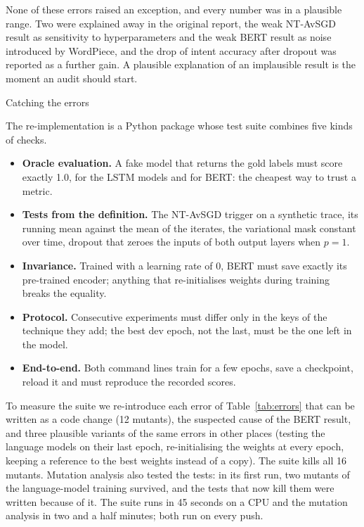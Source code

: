 \documentclass[10pt,twocolumn,a4paper]{article}
\makeatletter
\renewcommand\section{\@startsection{section}{1}{\z@}{-7pt plus -2pt minus -1pt}{3pt}%
  {\normalfont\normalsize\bfseries}}
\newenvironment{tightlist}{\begin{itemize}\setlength{\itemsep}{1pt}\setlength{\parskip}{0pt}%
  \setlength{\topsep}{2pt}\setlength{\leftmargin}{1.1em}}{\end{itemize}}
\makeatother
\begin{document}
None of these errors raised an exception, and every number was in a plausible range. Two were explained away in
the original report, the weak NT-AvSGD result as sensitivity to hyperparameters and the weak BERT result as noise
introduced by WordPiece, and the drop of intent accuracy after dropout was reported as a further gain. A plausible
explanation of an implausible result is the moment an audit should start.

\begin{table}[t]
  \caption{Step-wise effects reported by the original implementation and after the audit (test PPL reduction, or
  gain in points of F1 and accuracy; positive: the step helps).}
  \label{tab:effects}
  \centering
  \footnotesize
  \setlength{\tabcolsep}{3.5pt}
  
\end{table}


\section{Catching the errors}
\label{sec:checks}

The re-implementation is a Python package whose test suite combines five kinds of checks.
\begin{tightlist}
  \item \textbf{Oracle evaluation.} A fake model that returns the gold labels must score exactly 1.0, for the LSTM
    models and for BERT: the cheapest way to trust a metric.
  \item \textbf{Tests from the definition.} The NT-AvSGD trigger on a synthetic trace, its running mean against the
    mean of the iterates, the variational mask constant over time, dropout that zeroes the inputs of both output
    layers when $p=1$.
  \item \textbf{Invariance.} Trained with a learning rate of 0, BERT must save exactly its pre-trained encoder;
    anything that re-initialises weights during training breaks the equality.
  \item \textbf{Protocol.} Consecutive experiments must differ only in the keys of the technique they add; the
    best dev epoch, not the last, must be the one left in the model.
  \item \textbf{End-to-end.} Both command lines train for a few epochs, save a checkpoint, reload it and must
    reproduce the recorded scores.
\end{tightlist}
To measure the suite we re-introduce each error of Table~\ref{tab:errors} that can be written as a code change
(12 mutants), the suspected cause of the BERT result, and three plausible variants of the same errors in other
places (testing the language models on their last epoch, re-initialising the weights at every epoch, keeping a
reference to the best weights instead of a copy). The suite kills all 16 mutants. Mutation analysis also tested
the tests: in its first run, two mutants of the language-model training survived, and the tests that now kill
them were written because of it. The suite runs in 45 seconds on a CPU and the mutation analysis in two and a half
minutes; both run on every push.
\end{document}
